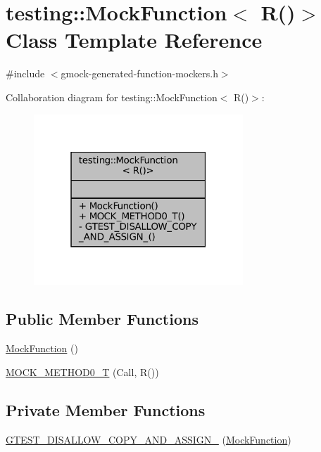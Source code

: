 \hypertarget{classtesting_1_1MockFunction_3_01R_07_08_4}{}\section{testing\+:\+:Mock\+Function$<$ R()$>$ Class Template Reference}
\label{classtesting_1_1MockFunction_3_01R_07_08_4}


{\ttfamily \#include $<$gmock-\/generated-\/function-\/mockers.\+h$>$}



Collaboration diagram for testing\+:\+:Mock\+Function$<$ R()$>$\+:
\nopagebreak
\begin{figure}[H]
\begin{center}
\leavevmode
\includegraphics[width=223pt]{classtesting_1_1MockFunction_3_01R_07_08_4__coll__graph}
\end{center}
\end{figure}
\subsection*{Public Member Functions}
\begin{DoxyCompactItemize}
\item 
\hyperlink{classtesting_1_1MockFunction_3_01R_07_08_4_acc6a6896f7f4b116b04e00d5a2088347}{Mock\+Function} ()
\item 
\hyperlink{classtesting_1_1MockFunction_3_01R_07_08_4_a08e7016e3e060a5cd375b66ff0cc04e8}{M\+O\+C\+K\+\_\+\+M\+E\+T\+H\+O\+D0\+\_\+T} (Call, R())
\end{DoxyCompactItemize}
\subsection*{Private Member Functions}
\begin{DoxyCompactItemize}
\item 
\hyperlink{classtesting_1_1MockFunction_3_01R_07_08_4_ada8f81bb2aa1d71fc1e2568dc6e03ce0}{G\+T\+E\+S\+T\+\_\+\+D\+I\+S\+A\+L\+L\+O\+W\+\_\+\+C\+O\+P\+Y\+\_\+\+A\+N\+D\+\_\+\+A\+S\+S\+I\+G\+N\+\_\+} (\hyperlink{classtesting_1_1MockFunction}{Mock\+Function})
\end{DoxyCompactItemize}


